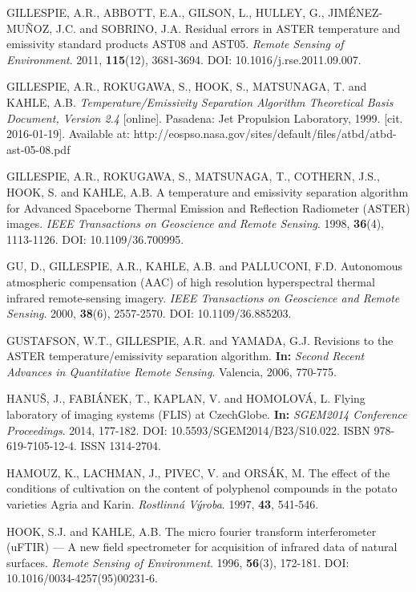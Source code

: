 \begin{thebibliography}{10}
 GILLESPIE, A.R., ABBOTT, E.A., GILSON, L., HULLEY, G., JIMÉNEZ-MUÑOZ, J.C. and SOBRINO, J.A. Residual errors in ASTER temperature and emissivity standard products AST08 and AST05. \textit{Remote Sensing of Environment}. 2011, \textbf{115}(12), 3681-3694. DOI: 10.1016/j.rse.2011.09.007.

 GILLESPIE, A.R., ROKUGAWA, S., HOOK, S., MATSUNAGA, T. and KAHLE, A.B. \textit{Temperature/Emissivity Separation Algorithm Theoretical Basis Document, Version 2.4} [online]. Pasadena: Jet Propulsion Laboratory, 1999. [cit. 2016-01-19]. Available at: http://eospso.nasa.gov/sites/default/files/atbd/atbd-ast-05-08.pdf 

 GILLESPIE, A.R., ROKUGAWA, S., MATSUNAGA, T., COTHERN, J.S., HOOK, S. and KAHLE, A.B. A temperature and emissivity separation algorithm for Advanced Spaceborne Thermal Emission and Reflection Radiometer (ASTER) images. \textit{IEEE Transactions on Geoscience and Remote Sensing}. 1998, \textbf{36}(4), 1113-1126. DOI: 10.1109/36.700995.

 GU, D., GILLESPIE, A.R., KAHLE, A.B. and PALLUCONI, F.D. Autonomous atmospheric compensation (AAC) of high resolution hyperspectral thermal infrared remote-sensing imagery. \textit{IEEE Transactions on Geoscience and Remote Sensing}. 2000, \textbf{38}(6), 2557-2570. DOI: 10.1109/36.885203.

 GUSTAFSON, W.T., GILLESPIE, A.R. and YAMADA, G.J. Revisions to the ASTER temperature/emissivity separation algorithm. \textbf{In:} \textit{Second Recent Advances in Quantitative Remote Sensing}. Valencia, 2006, 770-775.

 HANUŠ, J., FABIÁNEK, T., KAPLAN, V. and HOMOLOVÁ, L. Flying laboratory of imaging systems (FLIS) at CzechGlobe. \textbf{In:} \textit{SGEM2014 Conference Proceedings}. 2014, 177-182. DOI: 10.5593/SGEM2014/B23/S10.022. ISBN 978-619-7105-12-4. ISSN 1314-2704.

 HAMOUZ, K., LACHMAN, J., PIVEC, V. and ORSÁK, M. The effect of the conditions of cultivation on the content of polyphenol compounds in the potato varieties Agria and Karin. \textit{Rostlinná Výroba}. 1997, \textbf{43}, 541-546.

 HOOK, S.J. and KAHLE, A.B. The micro fourier transform interferometer (uFTIR) — A new field spectrometer for acquisition of infrared data of natural surfaces. \textit{Remote Sensing of Environment}. 1996, \textbf{56}(3), 172-181. DOI: 10.1016/0034-4257(95)00231-6.


\end{thebibliography}
